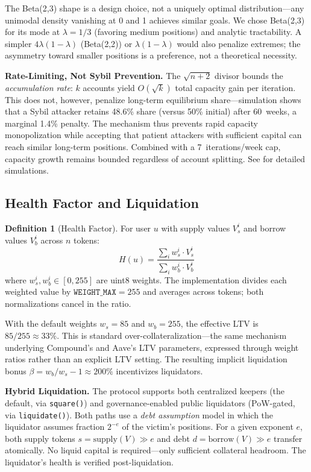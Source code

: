 \documentclass[10pt,a4paper,twocolumn]{article}
\theoremstyle{definition}
\newtheorem{definition}{Definition}[section]
\theoremstyle{plain}
\theoremstyle{remark}
\begin{document}
The Beta(2,3) shape is a design choice, not a uniquely optimal distribution---any unimodal density vanishing at 0 and 1 achieves similar goals. We chose Beta(2,3) for its mode at $\lambda = 1/3$ (favoring medium positions) and analytic tractability. A simpler $4\lambda(1{-}\lambda)$ (Beta(2,2)) or $\lambda(1{-}\lambda)$ would also penalize extremes; the asymmetry toward smaller positions is a preference, not a theoretical necessity.

\textbf{Rate-Limiting, Not Sybil Prevention.} The $\sqrt{n{+}2}$ divisor bounds the \emph{accumulation rate}: $k$ accounts yield $O(\sqrt{k})$ total capacity gain per iteration. This does not, however, penalize long-term equilibrium share---simulation shows that a Sybil attacker retains 48.6\% share (versus 50\% initial) after 60~weeks, a marginal 1.4\% penalty. The mechanism thus prevents rapid capacity monopolization while accepting that patient attackers with sufficient capital can reach similar long-term positions. Combined with a 7~iterations/week cap, capacity growth remains bounded regardless of account splitting. See \cite[\S D]{apx} for detailed simulations.

\subsection{Health Factor and Liquidation}
\label{subsec:health-liquidation}

\begin{definition}[Health Factor]
\label{def:health}
For user $u$ with supply values $V_s^i$ and borrow values $V_b^i$ across $n$ tokens:
\begin{equation}
\label{eq:health}
H(u) = \frac{\sum_i w_s^i \cdot V_s^i}{\sum_i w_b^i \cdot V_b^i}
\end{equation}
where $w_s^i, w_b^i \in [0, 255]$ are uint8 weights. The implementation divides each weighted value by $\texttt{WEIGHT\_MAX} = 255$ and averages across tokens; both normalizations cancel in the ratio.
\end{definition}

With the default weights $w_s = 85$ and $w_b = 255$, the effective LTV is $85/255 \approx 33\%$. This is standard over-collateralization---the same mechanism underlying Compound's and Aave's LTV parameters, expressed through weight ratios rather than an explicit LTV setting. The resulting implicit liquidation bonus $\beta = w_b/w_s - 1 \approx 200\%$ incentivizes liquidators.

\textbf{Hybrid Liquidation.} The protocol supports both centralized keepers (the default, via \texttt{square()}) and governance-enabled public liquidators (PoW-gated, via \texttt{liquidate()}). Both paths use a \emph{debt assumption} model in which the liquidator assumes fraction $2^{-e}$ of the victim's positions. For a given exponent $e$, both supply tokens $s = \text{supply}(V) \gg e$ and debt $d = \text{borrow}(V) \gg e$ transfer atomically. No liquid capital is required---only sufficient collateral headroom. The liquidator's health is verified post-liquidation.
\end{document}

